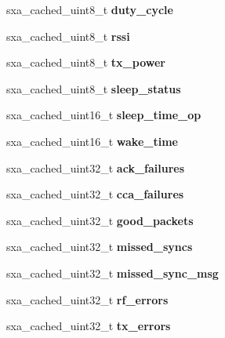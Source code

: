 \begin{DoxyCompactItemize}
sxa\+\_\+cached\+\_\+uint8\+\_\+t {\bfseries duty\+\_\+cycle}
\item 
\mbox{\label{structsxa__node__t_a0f7f3bc7364d8cace8d6271080973848}} 
sxa\+\_\+cached\+\_\+uint8\+\_\+t {\bfseries rssi}
\item 
\mbox{\label{structsxa__node__t_a99f0c98b1183b3312790bae7d260c904}} 
sxa\+\_\+cached\+\_\+uint8\+\_\+t {\bfseries tx\+\_\+power}
\item 
\mbox{\label{structsxa__node__t_a0966b19e355117ac1fd4b0803385f4a0}} 
sxa\+\_\+cached\+\_\+uint8\+\_\+t {\bfseries sleep\+\_\+status}
\item 
\mbox{\label{structsxa__node__t_a731ed9c34ea8cd4c59e540336a2f754b}} 
sxa\+\_\+cached\+\_\+uint16\+\_\+t {\bfseries sleep\+\_\+time\+\_\+op}
\item 
\mbox{\label{structsxa__node__t_a60c7dd44749ecf219809ebea0923156c}} 
sxa\+\_\+cached\+\_\+uint16\+\_\+t {\bfseries wake\+\_\+time}
\item 
\mbox{\label{structsxa__node__t_a1d997ce4ddc636bf758ce8b467c6375c}} 
sxa\+\_\+cached\+\_\+uint32\+\_\+t {\bfseries ack\+\_\+failures}
\item 
\mbox{\label{structsxa__node__t_ae386d0a73ecaa5d9e8ecdf2a5c1c937a}} 
sxa\+\_\+cached\+\_\+uint32\+\_\+t {\bfseries cca\+\_\+failures}
\item 
\mbox{\label{structsxa__node__t_ab651a5fe7d96c4a7310cf30dc5693f7d}} 
sxa\+\_\+cached\+\_\+uint32\+\_\+t {\bfseries good\+\_\+packets}
\item 
\mbox{\label{structsxa__node__t_ac7aa17ed22ae2c91a61313365fd9d37d}} 
sxa\+\_\+cached\+\_\+uint32\+\_\+t {\bfseries missed\+\_\+syncs}
\item 
\mbox{\label{structsxa__node__t_ae5c478ae4e83cf0d44c55ab530a7c265}} 
sxa\+\_\+cached\+\_\+uint32\+\_\+t {\bfseries missed\+\_\+sync\+\_\+msg}
\item 
\mbox{\label{structsxa__node__t_a2aceee1ec0b4d950e907d33ee61bf31f}} 
sxa\+\_\+cached\+\_\+uint32\+\_\+t {\bfseries rf\+\_\+errors}
\item 
\mbox{\label{structsxa__node__t_a98a3b8427635213b5171534ae43c0df9}} 
sxa\+\_\+cached\+\_\+uint32\+\_\+t {\bfseries tx\+\_\+errors}
\end{DoxyCompactItemize}


